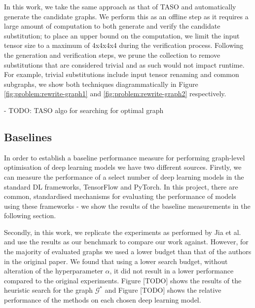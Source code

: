 In this work, we take the same approach as that of TASO and automatically generate the candidate graphs. We perform this as an offline step as it requires a large amount of computation to both generate and verify the candidate substitution; to place an upper bound on the computation, we limit the input tensor size to a maximum of 4x4x4x4 during the verification process. Following the generation and verification steps, we prune the collection to remove substitutions that are considered trivial and as such would not impact runtime. For example, trivial substitutions include input tensor renaming and common subgraphs, we show both techniques diagrammatically in Figure \ref{fig:problem:rewrite-graph1} and \ref{fig:problem:rewrite-graph2} respectively.

- TODO: TASO algo for searching for optimal graph

\subsection{Baselines}
In order to establish a baseline performance measure for performing graph-level optimisation of deep learning models we have two different sources. Firstly, we can measure the performance of a select number of deep learning models in the standard DL frameworks, TensorFlow and PyTorch. In this project, there are common, standardised mechanisms for evaluating the performance of models using these frameworks - we show the results of the baseline measurements in the following section.

Secondly, in this work, we replicate the experiments as performed by Jia et al. \cite{jia2019taso} and use the results as our benchmark to compare our work against. However, for the majority of evaluated graphs we used a lower budget than that of the authors in the original paper. We found that using a lower search budget, without alteration of the hyperparameter $\alpha$, it did not result in a lower performance compared to the original experiments. Figure [TODO] shows the results of the heuristic search for the graph $\mathcal{G}^*$ and Figure [TODO] shows the relative performance of the methods on each chosen deep learning model. 

% 



